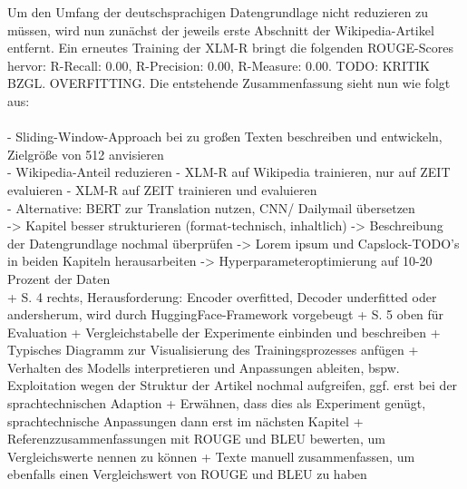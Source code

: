 \noindent
Um den Umfang der deutschsprachigen Datengrundlage nicht reduzieren zu müssen, wird nun zunächst der jeweils erste Abschnitt der Wikipedia-Artikel entfernt. Ein erneutes Training der \ac{XLM-R} bringt die folgenden \ac{ROUGE}-Scores hervor: R-Recall: 0.00, R-Precision: 0.00, R-Measure: 0.00. TODO: KRITIK BZGL. OVERFITTING. Die entstehende Zusammenfassung sieht nun wie folgt aus:\\

\noindent{}\\

\noindent
- Sliding-Window-Approach bei zu großen Texten beschreiben und entwickeln, Zielgröße von 512 anvisieren\\

\noindent
- Wikipedia-Anteil reduzieren
- XLM-R auf Wikipedia trainieren, nur auf ZEIT evaluieren
- XLM-R auf ZEIT trainieren und evaluieren\\

\noindent
- Alternative: BERT zur Translation nutzen, CNN/ Dailymail übersetzen\\

\noindent
-> Kapitel besser strukturieren (format-technisch, inhaltlich)
-> Beschreibung der Datengrundlage nochmal überprüfen
-> Lorem ipsum und Capslock-TODO's in beiden Kapiteln herausarbeiten 
-> Hyperparameteroptimierung auf 10-20 Prozent der Daten\\


\noindent
+ \cite{YAN19} S. 4 rechts, Herausforderung: Encoder overfitted, Decoder underfitted oder andersherum, wird durch HuggingFace-Framework vorgebeugt
+ \cite{YAN19} S. 5 oben für Evaluation
+ Vergleichstabelle der Experimente einbinden und beschreiben
+ Typisches Diagramm zur Visualisierung des Trainingsprozesses anfügen
+ Verhalten des Modells interpretieren und Anpassungen ableiten, bspw. Exploitation wegen der Struktur der Artikel nochmal aufgreifen, ggf. erst bei der sprachtechnischen Adaption
+ Erwähnen, dass dies als Experiment genügt, sprachtechnische Anpassungen dann erst im nächsten Kapitel
+ Referenzzusammenfassungen mit ROUGE und BLEU bewerten, um Vergleichswerte nennen zu können
+ Texte manuell zusammenfassen, um ebenfalls einen Vergleichswert von ROUGE und BLEU zu haben\\
